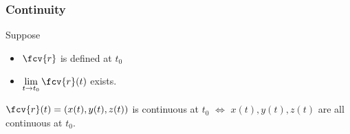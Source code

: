 \begin{frame}
\frametitle{Continuity}
\begin{definition}
Suppose
\begin{itemize}
\item $\fcv{r}$ is defined at $t_0$
\item<2-> $\lim\limits_{t\to t_0} \fcv{r}(t)$ exists.
\end{itemize}
\end{definition}
\begin{observation}
$\fcv{r}(t) = ( x(t), y(t), z(t) )$ is continuous at $t_0$ $\Longleftrightarrow$ $x(t), y(t), z(t) $ are all continuous at $t_0$.

\end{observation}


\end{frame}
